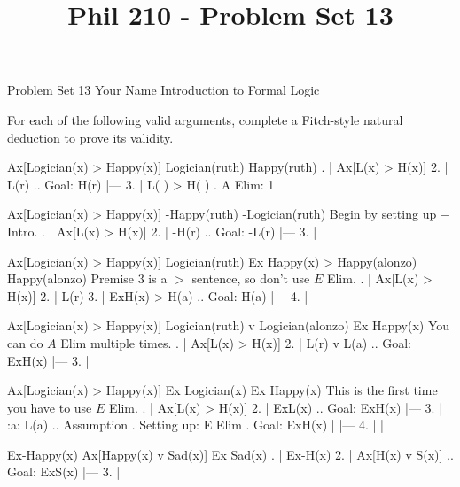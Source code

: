 
\title{Phil 210 - Problem Set 13}

\heading
Problem Set 13
Your Name
Introduction to Formal Logic
\endheading

For each of the following valid arguments, complete a Fitch-style natural deduction to prove its validity.

\quantifiers
\problems
{}
\argument
 Ax[Logician(x) > Happy(x)]
 Logician(ruth) 
\argumentline
 Happy(ruth) 
\endargument
        \answer
        . | Ax[L(x) > H(x)]
         2. | L(r)             ..  Goal: H(r)
            |---
         3. | L( ) > H( )      .  A Elim: 1
        \endfitchproof
        \endanswer

\argument
 Ax[Logician(x) > Happy(x)]
 -Happy(ruth) 
\argumentline
 -Logician(ruth) 
\endargument
\Hint Begin by setting up $-$ Intro.
        \answer
        . | Ax[L(x) > H(x)]
         2. | -H(r)             ..  Goal: -L(r)
            |---
         3. | 
        \endfitchproof
        \endanswer

\argument
 Ax[Logician(x) > Happy(x)]
 Logician(ruth)
 Ex Happy(x) > Happy(alonzo)
\argumentline
 Happy(alonzo) 
\endargument
\Hint Premise 3 is a $>$ sentence, so don't use $E$ Elim.
        \answer
        . | Ax[L(x) > H(x)]
         2. | L(r)
         3. | ExH(x) > H(a)    ..  Goal: H(a)
            |---
         4. |
        \endfitchproof
        \endanswer

\argument
 Ax[Logician(x) > Happy(x)]
 Logician(ruth) v Logician(alonzo)
\argumentline
 Ex Happy(x)
\endargument
\Hint You can do $A$ Elim multiple times.
        \answer
        . | Ax[L(x) > H(x)]
         2. | L(r) v L(a)      ..  Goal: ExH(x)
            |---
         3. | 
        \endfitchproof
        \endanswer

\argument
 Ax[Logician(x) > Happy(x)]
 Ex Logician(x)
\argumentline
 Ex Happy(x)
\endargument
\Hint This is the first time you have to use $E$ Elim.
        \answer
        . | Ax[L(x) > H(x)]
         2. | ExL(x)           ..  Goal: ExH(x)
            |---
         3. |   | :a: L(a)     ..  Assumption  .  Setting up: E Elim  .  Goal: ExH(x)
            |   |---
         4. |   |
        \endfitchproof
        \endanswer

\argument
 Ex-Happy(x)
 Ax[Happy(x) v Sad(x)]
\argumentline
 Ex Sad(x)
\endargument
        \answer
        . | Ex-H(x)
         2. | Ax[H(x) v S(x)]  ..  Goal: ExS(x)
            |---
         3. | 
        \endfitchproof
        \endanswer

\endproblems
\bye
